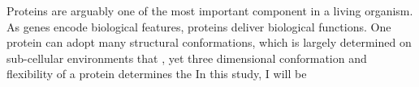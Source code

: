 Proteins are arguably one of the most important component in a living organism. As genes encode biological features, proteins deliver biological functions. One protein can adopt many structural conformations, which is largely determined on sub-cellular environments that  , yet three dimensional conformation and flexibility of a protein determines the     In this study, I will be 